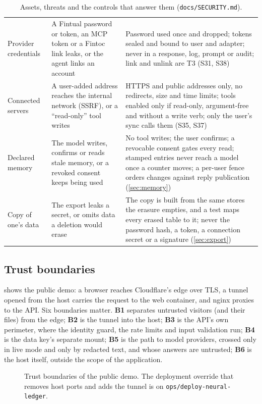 \begin{table}[htbp]
\begin{tabularx}{\linewidth}{@{}p{26mm}XX@{}}
    Provider credentials & A Fintual password or token, an MCP token or a Fintoc link leaks, or the agent links an account & Password used once and dropped; tokens sealed and bound to user and adapter; never in a response, log, prompt or audit; link and unlink are T3 (S31, S38) \\
    Connected servers & A user-added address reaches the internal network (SSRF), or a ``read-only'' tool writes & HTTPS and public addresses only, no redirects, size and time limits; tools enabled only if read-only, argument-free and without a write verb; only the user's sync calls them (S35, S37) \\
    Declared memory & The model writes, confirms or reads stale memory, or a revoked consent keeps being used & No tool writes; the user confirms; a revocable consent gates every read; stamped entries never reach a model once a counter moves; a per-user fence orders changes against reply publication (\cref{sec:memory}) \\
    Copy of one's data & The export leaks a secret, or omits data a deletion would erase & The copy is built from the same stores the erasure empties, and a test maps every erased table to it; never the password hash, a token, a connection secret or a signature (\cref{sec:export}) \\
    \bottomrule
  \end{tabularx}
  \caption{Assets, threats and the controls that answer them (\texttt{docs/SECURITY.md}).}\label{tab:threats}
\end{table}

\subsection{Trust boundaries}

 shows the public demo: a browser reaches Cloudflare's edge over TLS, a tunnel opened from the host
carries the request to the web container, and nginx proxies  to the API. Six boundaries matter.
\textbf{B1} separates untrusted visitors (and their files) from the edge; \textbf{B2} is the tunnel into the host;
\textbf{B3} is the API's own perimeter, where the identity guard, the rate limits and input validation run; \textbf{B4}
is the data key's separate mount; \textbf{B5} is the path to model providers, crossed only in live mode and only by
redacted text, and whose answers are untrusted; \textbf{B6} is the host itself, outside the scope of the application.

\begin{figure}[htbp]
  \centering
  
  \caption{Trust boundaries of the public demo. The deployment override that removes host ports and adds the tunnel is on \texttt{ops/deploy-neural-ledger}.}\label{fig:trust}
\end{figure}

